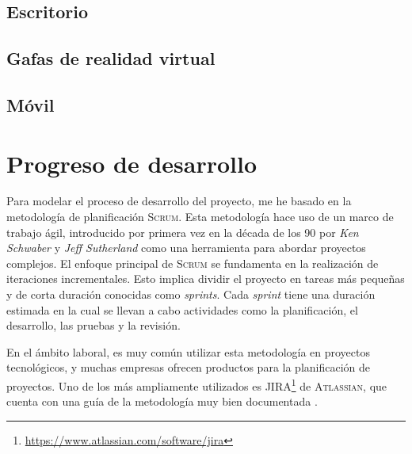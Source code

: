 \documentclass[a4paper, 11pt]{book}
\begin{document}
\subsection{Escritorio}
\subsection{Gafas de realidad virtual}
\subsection{Móvil}
\section{Progreso de desarrollo}
Para modelar el proceso de desarrollo del proyecto, me he basado en la metodología de planificación \textsc{Scrum}.
Esta metodología hace uso de un marco de trabajo ágil, introducido por primera vez en la década de los 90 por \emph{Ken Schwaber} y \emph{Jeff Sutherland} como una herramienta para abordar proyectos complejos.
El enfoque principal de \textsc{Scrum} se fundamenta en la realización de iteraciones incrementales. Esto implica dividir el proyecto en tareas más pequeñas y de corta duración conocidas como \emph{sprints}. 
Cada \emph{sprint} tiene una duración estimada en la cual se llevan a cabo actividades como la planificación, el desarrollo, las pruebas y la revisión.

En el ámbito laboral, es muy común utilizar esta metodología en proyectos tecnológicos, y muchas empresas ofrecen productos para la planificación de proyectos. Uno de los más ampliamente utilizados es \textsc{JIRA}\footnote{\url{https://www.atlassian.com/software/jira}} de \textsc{Atlassian}, que cuenta con una guía de la metodología muy bien documentada \cite{scrumGuide}.
\end{document}

